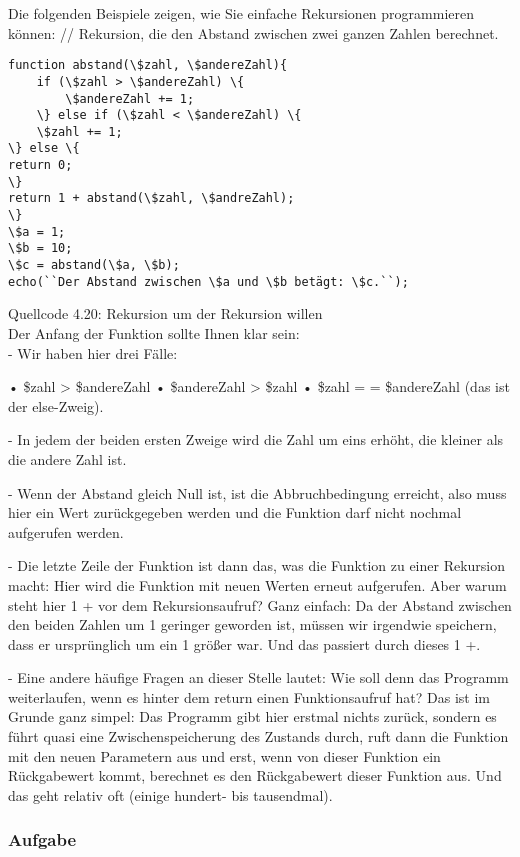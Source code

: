 Die folgenden Beispiele zeigen, wie Sie einfache Rekursionen programmieren können:
// Rekursion, die den Abstand zwischen zwei ganzen Zahlen berechnet.\\

\begin{verbatim}
function abstand(\$zahl, \$andereZahl){
	if (\$zahl > \$andereZahl) \{
		\$andereZahl += 1;
	\} else if (\$zahl < \$andereZahl) \{
	\$zahl += 1;
\} else \{
return 0;
\}
return 1 + abstand(\$zahl, \$andreZahl);
\}
\$a = 1;
\$b = 10;
\$c = abstand(\$a, \$b);
echo(``Der Abstand zwischen \$a und \$b betägt: \$c.``);
\end{verbatim}
Quellcode 4.20: Rekursion um der Rekursion willen\\


Der Anfang der Funktion sollte Ihnen klar sein: \\

-	Wir haben hier drei Fälle: 

•	\$zahl > \$andereZahl
•	\$andereZahl > \$zahl 
•	\$zahl = = \$andereZahl (das ist der else-Zweig).

-	In jedem der beiden ersten Zweige wird die Zahl um eins erhöht, die kleiner als die andere Zahl ist. 

-	Wenn der Abstand gleich Null ist, ist die Abbruchbedingung erreicht, also muss hier ein Wert zurückgegeben werden und die Funktion darf nicht nochmal aufgerufen werden.

-	Die letzte Zeile der Funktion ist dann das, was die Funktion zu einer Rekursion macht: Hier wird die Funktion mit neuen Werten erneut aufgerufen.
Aber warum steht hier 1 + vor dem Rekursionsaufruf? Ganz einfach: Da der Abstand zwischen den beiden Zahlen um 1 geringer geworden ist, müssen wir irgendwie speichern, dass er ursprünglich um ein 1 größer war. Und das passiert durch dieses 1 +.

-	Eine andere häufige Fragen an dieser Stelle lautet: Wie soll denn das Programm weiterlaufen, wenn es hinter dem return einen Funktionsaufruf hat? Das ist im Grunde ganz simpel: Das Programm gibt hier erstmal nichts zurück, sondern es führt quasi eine Zwischenspeicherung des Zustands durch, ruft dann die Funktion mit den neuen Parametern aus und erst, wenn von dieser Funktion ein Rückgabewert kommt, berechnet es den Rückgabewert dieser Funktion aus. Und das geht relativ oft (einige hundert- bis tausendmal).

\subsubsection{Aufgabe}

